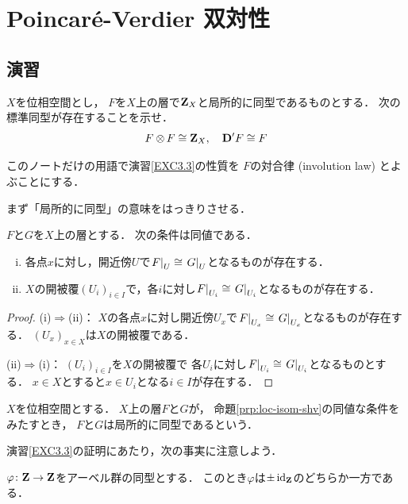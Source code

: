 \chapter{Poincar\'e-Verdier 双対性}\label{chap3}
\section*{演習}

\setcounter{EXC}{2}
\begin{leftbar}
\begin{EXC}\label{EXC3.3}
    \(X\)を位相空間とし，
    \(F\)を\(X\)上の層で\(\zz_X\)と局所的に同型であるものとする．
    次の標準同型が存在することを示せ．
    \[
        F\tens[]F\cong \zz_X,
        \quad
        \vD'{F}\cong F
    \]
\end{EXC}
\end{leftbar}

このノートだけの用語で演習\ref{EXC3.3}の性質を
\(F\)の対合律 (involution law) とよぶことにする．

まず「局所的に同型」の意味をはっきりさせる．
\begin{PRP}\label{prp:loc-isom-shv}
    \(F\)と\(G\)を\(X\)上の層とする．
    次の条件は同値である．
    \begin{enumerate}[(i)]
        \item 各点\(x\)に対し，開近傍\(U\)で\(\mres[F]{U}\cong\mres[G]{U}\)となるものが存在する．
        \item \(X\)の開被覆\((U_i)_{i\in I}\)で，各\(i\)に対し\(\mres[F]{U_{i}}\cong\mres[G]{U_{i}}\)となるものが存在する．
    \end{enumerate}
\end{PRP}
\begin{proof}
    (i)\(\Rightarrow\)(ii)：
    \(X\)の各点\(x\)に対し開近傍\(U_x\)で\(
        \mres[F]{U_{x}}\cong\mres[G]{U_{x}}
    \)となるものが存在する．
    \((U_x)_{x\in X}\)は\(X\)の開被覆である．

    (ii)\(\Rightarrow\)(i)：
    \((U_i)_{i\in I}\)を\(X\)の開被覆で
    各\(U_i\)に対し\(\mres[F]{U_{i}}\cong\mres[G]{U_{i}}\)となるものとする．
    \(x\in X\)とすると\(x\in U_{i}\)となる\(i\in I\)が存在する．
\end{proof}
\begin{DFN}
    \(X\)を位相空間とする．
    \(X\)上の層\(F\)と\(G\)が，
    命題\ref{prp:loc-isom-shv}の同値な条件をみたすとき，
    \(F\)と\(G\)は局所的に同型であるという．
\end{DFN}

演習\ref{EXC3.3}の証明にあたり，次の事実に注意しよう．
\begin{LMM}\label{lmm:pm1}
    \(\varphi\colon\zz\to\zz\)をアーベル群の同型とする．
    このとき\(\varphi\)は\(\pm\id_{\zz}\)のどちらか一方である．
\end{LMM}

